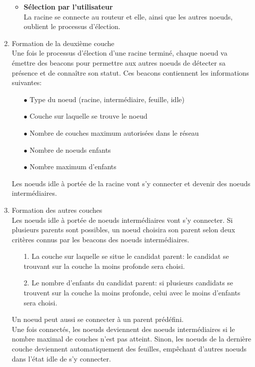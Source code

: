 \documentclass[a4paper, 12pt]{report}
\begin{document}
\begin{enumerate}
\begin{itemize}
                    \item \textbf{Sélection par l'utilisateur}\\
                        La racine se connecte au routeur et elle, ainsi que les autres noeuds, oublient le processus
                        d'élection.
                \end{itemize}
            \item Formation de la deuxième couche\\
                Une fois le processus d'élection d'une racine terminé, chaque noeud va émettre des beacons
                pour permettre aux autres noeuds de détecter sa présence et de connaître son statut.
                Ces beacons contiennent les informations suivantes:
                \begin{itemize}
                    \item[$\bullet$] Type du noeud (racine, intermédiaire, feuille, idle)
                    \item[$\bullet$] Couche sur laquelle se trouve le noeud
                    \item[$\bullet$] Nombre de couches maximum autorisées dans le réseau
                    \item[$\bullet$] Nombre de noeuds enfants
                    \item[$\bullet$] Nombre maximum d'enfants   
                \end{itemize}
                Les noeuds idle à portée de la racine vont s'y connecter et devenir des noeuds intermédiaires.
            
            \item Formation des autres couches\\
                Les noeuds idle à portée de noeuds intermédiaires vont s'y connecter. Si plusieurs parents
                sont possibles, un noeud choisira son parent selon deux critères connus par les beacons des noeuds intermédiaires.
                \begin{enumerate}
                    \addtolength{\itemindent}{1cm}
                    \item[1.] La couche sur laquelle se situe le candidat parent:
                        le candidat se trouvant sur la couche la moins profonde sera choisi. 
                    \item[2.] Le nombre d'enfants du candidat parent: si plusieurs candidats se trouvent
                        sur la couche la moins profonde, celui avec le moins d'enfants sera choisi. 
                \end{enumerate}
                
                Un noeud peut aussi se connecter à un parent prédéfini.\\

                Une fois connectés, les noeuds deviennent des noeuds intermédiaires si le nombre maximal de couches n'est pas atteint.
                Sinon, les noeuds de la dernière couche deviennent automatiquement
                des feuilles, empêchant d'autres noeuds dans l'état idle de s'y connecter.

        \end{enumerate}
\end{document}

